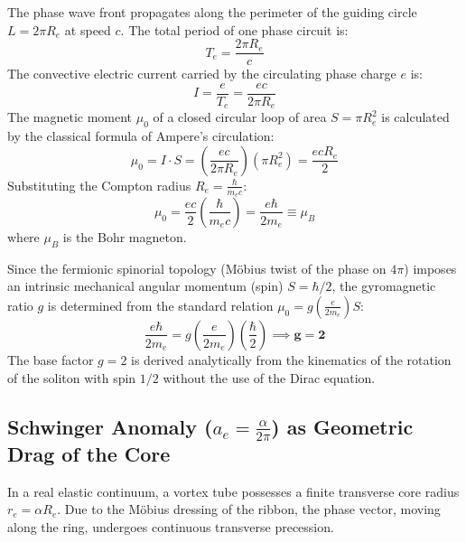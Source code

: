\documentclass[12pt,a4paper]{article}
\begin{document}
	The phase wave front propagates along the perimeter of the guiding circle $L = 2\pi R_e$ at speed $c$. The total period of one phase circuit is:
	\begin{equation}
		T_e = \frac{2\pi R_e}{c}
	\end{equation}
	The convective electric current carried by the circulating phase charge $e$ is:
	\begin{equation}
		I = \frac{e}{T_e} = \frac{e c}{2\pi R_e}
	\end{equation}
	The magnetic moment $\mu_0$ of a closed circular loop of area $S = \pi R_e^2$ is calculated by the classical formula of Ampere's circulation:
	\begin{equation}
		\mu_0 = I \cdot S = \left( \frac{e c}{2\pi R_e} \right) \left( \pi R_e^2 \right) = \frac{e c R_e}{2}
	\end{equation}
	Substituting the Compton radius $R_e = \frac{\hbar}{m_e c}$:
	\begin{equation}
		\mu_0 = \frac{e c}{2} \left( \frac{\hbar}{m_e c} \right) = \frac{e \hbar}{2 m_e} \equiv \mu_B
	\end{equation}
	where $\mu_B$ is the Bohr magneton.
	
	Since the fermionic spinorial topology (Möbius twist of the phase on $4\pi$) imposes an intrinsic mechanical angular momentum (spin) $S = \hbar/2$, the gyromagnetic ratio $g$ is determined from the standard relation $\mu_0 = g \left( \frac{e}{2 m_e} \right) S$:
	\begin{equation}
		\frac{e \hbar}{2 m_e} = g \left( \frac{e}{2 m_e} \right) \left( \frac{\hbar}{2} \right) \implies \mathbf{g = 2}
	\end{equation}
	The base factor $g=2$ is derived analytically from the kinematics of the rotation of the soliton with spin $1/2$ without the use of the Dirac equation.
	
	\subsection{Schwinger Anomaly ($a_e = \frac{\alpha}{2\pi}$) as Geometric Drag of the Core}
	In a real elastic continuum, a vortex tube possesses a finite transverse core radius $r_e = \alpha R_e$. Due to the Möbius dressing of the ribbon, the phase vector, moving along the ring, undergoes continuous transverse precession.
	
\end{document}
